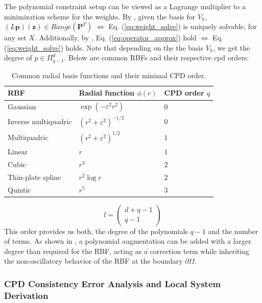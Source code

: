 \documentclass[11pt]{article}
\begin{document}
The polynomial constraint setup can be viewed as a Lagrange multiplier to a minimization scheme for the weights. By \cite{Davydov2020}, given the basis for $V_h$, $(L\bm{p})(\bm{z}) \in Range(\bm{P}^T)$ $\iff$ Eq. (\ref{eq:weight_solve}) is uniquely solvable, for any set $X$. Additionally, by \cite{Davydov2020}, Eq. (\ref{eq:operator_approx}) hold $\iff$ Eq. (\ref{eq:weight_solve}) holds. Note that depending on the the basis $V_h$, we get the degree of $p \in \Pi_{q-1}^d$. Below are common RBFs and their respective cpd orders:
\begin{table}[ht]
    \centering
    \caption{Common radial basis functions and their minimal CPD order.}
    \label{tab:rbf-cpd-order}
    \begin{tabular}{lll}
        \hline
        \textbf{RBF} & \textbf{Radial function $\phi(r)$} & 
        \textbf{CPD order $q$} \\
        \hline
        Gaussian & $\exp(-\varepsilon^2 r^2)$ & $0$ \\[2pt]
        Inverse multiquadric & 
        $(r^2+\varepsilon^2)^{-1/2}$ & $0$ \\[2pt]
        Multiquadric & 
        $(r^2+\varepsilon^2)^{1/2}$ & $1$ \\[2pt]
        Linear & $r$ & $1$ \\[2pt]
        Cubic & $r^3$ & $2$ \\[2pt]
        Thin-plate spline & $r^2\log r$ & $2$ \\[2pt]
        Quintic & $r^5$ & $3$ \\[2pt]
        \hline
    \end{tabular}
\end{table}
\begin{equation*}
l=\begin{pmatrix}
	d+q-1 \\ q-1
\end{pmatrix}
\end{equation*}
This order provides us both, the degree of the polynomials $q-1$ and the number of terms. As shown in \cite{Bayona2019}, a polynomial augmentation can be added with a larger degree than required for the RBF, acting as a correction term while inheriting the non-oscillatory behavior of the RBF at the boundary $\partial \Omega$.

\subsubsection{CPD Consistency Error Analysis and Local System Derivation}
\end{document}
